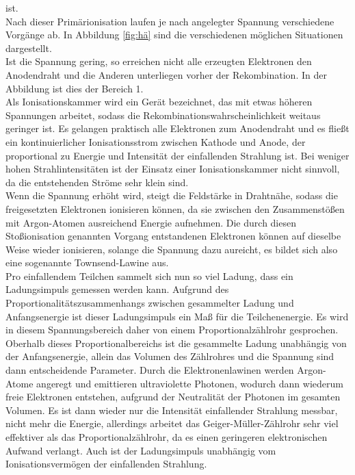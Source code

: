 ist. \\
Nach dieser Primärionisation laufen je nach angelegter Spannung verschiedene
Vorgänge ab. In Abbildung \ref{fig:hä} sind die verschiedenen möglichen
Situationen dargestellt.\\
Ist die Spannung gering, so erreichen nicht alle erzeugten Elektronen den Anodendraht
und die Anderen unterliegen vorher der Rekombination. In der Abbildung ist
dies der Bereich 1.\\
Als Ionisationskammer wird ein Gerät bezeichnet, das mit etwas höheren Spannungen
arbeitet, sodass die Rekombinationswahrscheinlichkeit weitaus geringer ist.
Es gelangen praktisch alle Elektronen zum Anodendraht und es fließt ein kontinuierlicher
Ionisationsstrom zwischen Kathode und Anode, der proportional zu Energie und
Intensität der einfallenden Strahlung ist. Bei weniger hohen Strahlintensitäten
ist der Einsatz einer Ionisationskammer nicht sinnvoll, da die entstehenden Ströme 
sehr klein sind.\\
Wenn die Spannung erhöht wird, steigt die Feldstärke in Drahtnähe, sodass die 
freigesetzten Elektronen ionisieren können, da sie zwischen den Zusammenstößen 
mit Argon-Atomen ausreichend Energie aufnehmen. Die durch diesen Stoßionisation genannten
Vorgang entstandenen Elektronen können auf dieselbe Weise wieder ionisieren,
solange die Spannung dazu aureicht, es bildet sich also eine sogenannte Townsend-Lawine
aus. \\
Pro einfallendem Teilchen sammelt sich nun so viel Ladung, dass ein Ladungsimpuls 
gemessen werden kann. Aufgrund des Proportionalitätszusammenhangs zwischen
gesammelter Ladung und Anfangsenergie ist dieser Ladungsimpuls ein Maß für 
die Teilchenenergie. Es wird in diesem Spannungsbereich daher von einem 
Proportionalzählrohr gesprochen.\\
Oberhalb dieses Proportionalbereichs ist die gesammelte Ladung unabhängig 
von der Anfangsenergie, allein das Volumen des Zählrohres und die Spannung sind
dann entscheidende Parameter. Durch die Elektronenlawinen werden Argon-Atome angeregt
und emittieren ultraviolette Photonen, wodurch dann wiederum 
freie Elektronen entstehen, aufgrund der Neutralität der Photonen im gesamten Volumen.
Es ist dann wieder nur die Intensität einfallender Strahlung messbar, nicht mehr
die Energie, allerdings arbeitet das Geiger-Müller-Zählrohr sehr viel effektiver als
das Proportionalzählrohr, da es einen geringeren elektronischen Aufwand verlangt.
Auch ist der Ladungsimpuls unabhängig vom Ionisationsvermögen der einfallenden Strahlung.

